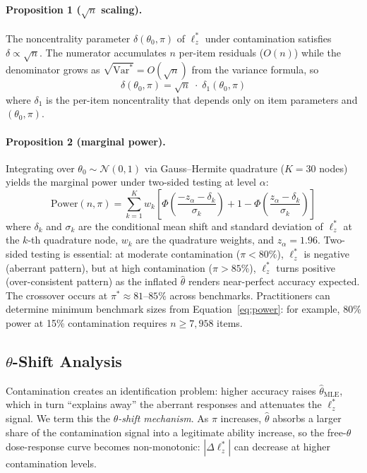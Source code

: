 \paragraph{Proposition 1 ($\sqrt{n}$ scaling).}
The noncentrality parameter $\delta(\theta_0, \pi)$ of $\ell_z^*$ under contamination satisfies $\delta \propto \sqrt{n}$.
The numerator accumulates $n$ per-item residuals ($O(n)$) while the denominator grows as $\sqrt{\mathrm{Var}^*} = O(\sqrt{n})$ from the \citet{snijders2001} variance formula, so
\begin{equation}
  \delta(\theta_0, \pi) = \sqrt{n}\;\cdot\;\delta_1(\theta_0, \pi)
  \label{eq:sqrt_n}
\end{equation}
where $\delta_1$ is the per-item noncentrality that depends only on item parameters and $(\theta_0, \pi)$.

\paragraph{Proposition 2 (marginal power).}
Integrating over $\theta_0 \sim \mathcal{N}(0,1)$ via Gauss--Hermite quadrature ($K{=}30$ nodes) yields the marginal power under two-sided testing at level $\alpha$:
\begin{equation}
  \mathrm{Power}(n, \pi) = \sum_{k=1}^{K} w_k \left[\Phi\!\left(\frac{-z_\alpha - \delta_k}{\sigma_k}\right) + 1 - \Phi\!\left(\frac{z_\alpha - \delta_k}{\sigma_k}\right)\right]
  \label{eq:power}
\end{equation}
where $\delta_k$ and $\sigma_k$ are the conditional mean shift and standard deviation of $\ell_z^*$ at the $k$-th quadrature node, $w_k$ are the quadrature weights, and $z_\alpha = 1.96$.
Two-sided testing is essential: at moderate contamination ($\pi < 80\%$), $\ell_z^*$ is negative (aberrant pattern), but at high contamination ($\pi > 85\%$), $\ell_z^*$ turns positive (over-consistent pattern) as the inflated $\hat{\theta}$ renders near-perfect accuracy expected.
The crossover occurs at $\pi^* \approx 81$--$85\%$ across benchmarks.
Practitioners can determine minimum benchmark sizes from Equation~\ref{eq:power}: for example, 80\% power at 15\% contamination requires $n \geq 7{,}958$ items.

\subsection{$\theta$-Shift Analysis}
\label{sec:theta_shift}

Contamination creates an identification problem: higher accuracy raises $\hat{\theta}_{\text{MLE}}$, which in turn ``explains away'' the aberrant responses and attenuates the $\ell_z^*$ signal.
We term this the \emph{$\theta$-shift mechanism}.
As $\pi$ increases, $\hat{\theta}$ absorbs a larger share of the contamination signal into a legitimate ability increase, so the free-$\theta$ dose-response curve becomes non-monotonic: $|\Delta\ell_z^*|$ can decrease at higher contamination levels.

